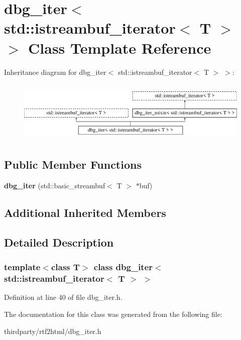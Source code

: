 \hypertarget{classdbg__iter_3_01std_1_1istreambuf__iterator_3_01_t_01_4_01_4}{}\section{dbg\+\_\+iter$<$ std\+:\+:istreambuf\+\_\+iterator$<$ T $>$ $>$ Class Template Reference}
\label{classdbg__iter_3_01std_1_1istreambuf__iterator_3_01_t_01_4_01_4}
Inheritance diagram for dbg\+\_\+iter$<$ std\+:\+:istreambuf\+\_\+iterator$<$ T $>$ $>$\+:\begin{figure}[H]
\begin{center}
\leavevmode
\includegraphics[height=2.968198cm]{classdbg__iter_3_01std_1_1istreambuf__iterator_3_01_t_01_4_01_4}
\end{center}
\end{figure}
\subsection*{Public Member Functions}
\begin{DoxyCompactItemize}
\item 
\mbox{\label{classdbg__iter_3_01std_1_1istreambuf__iterator_3_01_t_01_4_01_4_a54067f457389f5b9aff01e1ba4812103}} 
{\bfseries dbg\+\_\+iter} (std\+::basic\+\_\+streambuf$<$ T $>$ $\ast$buf)
\end{DoxyCompactItemize}
\subsection*{Additional Inherited Members}


\subsection{Detailed Description}
\subsubsection*{template$<$class T$>$\newline
class dbg\+\_\+iter$<$ std\+::istreambuf\+\_\+iterator$<$ T $>$ $>$}



Definition at line 40 of file dbg\+\_\+iter.\+h.



The documentation for this class was generated from the following file\+:\begin{DoxyCompactItemize}
\item 
thirdparty/rtf2html/dbg\+\_\+iter.\+h\end{DoxyCompactItemize}
